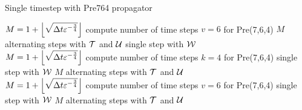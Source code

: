 \begin{algorithm}[h]
	\caption{Single timestep with Pre764 propagator}
	\label{alg:pre764}
	\begin{algorithmic}
	\State
		\State
		\State $M = 1+ \left\lfloor \sqrt{\Delta t \varepsilon^{-\frac{3}{4}}} \right\rfloor$
		\Comment compute number of time steps
		 \Comment $v=6$ for Pre(7,6,4)
			\State {}
			\Comment $M$ alternating steps with $\mathcal{T}$ and $\mathcal{U}$
			\State {}
			\Comment single step with $\mathcal{W}$
		\EndFor
		\State
	\EndProcedure
		\\\hrulefill
		\State
		\State
		\State $M = 1+ \left\lfloor \sqrt{\Delta t \varepsilon^{-\frac{3}{4}}} \right\rfloor$
		\Comment compute number of time steps
		 \Comment $k=4$ for Pre(7,6,4)
			\State {}
			\Comment single step with $\mathcal{W}$
			\State {}
			\Comment $M$ alternating steps with $\mathcal{T}$ and $\mathcal{U}$
		\EndFor
		\State
	\EndProcedure
		\\\hrulefill
		\State
		\State
		\State $M = 1+ \left\lfloor \sqrt{\Delta t \varepsilon^{-\frac{3}{4}}} \right\rfloor$
		\Comment compute number of time steps
		 \Comment $v=6$ for Pre(7,6,4)
			\State {}
			\Comment single step with $\mathcal{W}$
			\State {}
			\Comment $M$ alternating steps with $\mathcal{T}$ and $\mathcal{U}$
		\EndFor
		\State
	\EndProcedure
	\end{algorithmic}
\end{algorithm}


